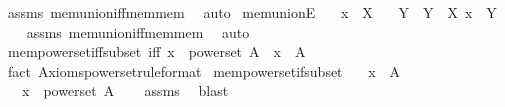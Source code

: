 \begin{isabellebody}
\isamarkupfalse%
\ assms\ mem{\isacharunderscore}{\kern0pt}union{\isacharunderscore}{\kern0pt}iff{\isacharunderscore}{\kern0pt}mem{\isacharunderscore}{\kern0pt}mem\ \isamarkupfalse%
\ auto%
\endisatagproof
{\isafoldproof}%
%
\isadelimproof
\isanewline
%
\endisadelimproof
\isanewline
{}\isamarkupfalse%
\ mem{\isacharunderscore}{\kern0pt}unionE{\isacharcolon}{\kern0pt}\isanewline
\ \ \ {\isachardoublequoteopen}x\ {\isasymin}\ {\isasymUnion}X{\isachardoublequoteclose}\isanewline
\ \ \ Y\ \ {\isachardoublequoteopen}Y\ {\isasymin}\ X{\isachardoublequoteclose}\ {\isachardoublequoteopen}x\ {\isasymin}\ Y{\isachardoublequoteclose}\isanewline
%
\isadelimproof
\ \ %
\endisadelimproof
%
\isatagproof
{}\isamarkupfalse%
\ assms\ mem{\isacharunderscore}{\kern0pt}union{\isacharunderscore}{\kern0pt}iff{\isacharunderscore}{\kern0pt}mem{\isacharunderscore}{\kern0pt}mem\ \isamarkupfalse%
\ auto%
\endisatagproof
{\isafoldproof}%
%
\isadelimproof
\isanewline
%
\endisadelimproof
\isanewline
{}\isamarkupfalse%
\ mem{\isacharunderscore}{\kern0pt}powerset{\isacharunderscore}{\kern0pt}iff{\isacharunderscore}{\kern0pt}subset\ {\isacharbrackleft}{\kern0pt}iff{\isacharbrackright}{\kern0pt}{\isacharcolon}{\kern0pt}\ {\isachardoublequoteopen}{\isacharparenleft}{\kern0pt}x\ {\isasymin}\ powerset\ A{\isacharparenright}{\kern0pt}\ {\isasymlongleftrightarrow}\ {\isacharparenleft}{\kern0pt}x\ {\isasymsubseteq}\ A{\isacharparenright}{\kern0pt}{\isachardoublequoteclose}\isanewline
%
\isadelimproof
\ \ %
\endisadelimproof
%
\isatagproof
{}\isamarkupfalse%
\ {\isacharparenleft}{\kern0pt}fact\ Axioms{\isachardot}{\kern0pt}powerset{\isacharbrackleft}{\kern0pt}rule{\isacharunderscore}{\kern0pt}format{\isacharbrackright}{\kern0pt}{\isacharparenright}{\kern0pt}%
\endisatagproof
{\isafoldproof}%
%
\isadelimproof
\isanewline
%
\endisadelimproof
\isanewline
{}\isamarkupfalse%
\ mem{\isacharunderscore}{\kern0pt}powerset{\isacharunderscore}{\kern0pt}if{\isacharunderscore}{\kern0pt}subset{\isacharcolon}{\kern0pt}\isanewline
\ \ \ {\isachardoublequoteopen}x\ {\isasymsubseteq}\ A{\isachardoublequoteclose}\isanewline
\ \ \ {\isachardoublequoteopen}x\ {\isasymin}\ powerset\ A{\isachardoublequoteclose}\isanewline
%
\isadelimproof
\ \ %
\endisadelimproof
%
\isatagproof
{}\isamarkupfalse%
\ assms\ \isamarkupfalse%
\ blast%
\endisatagproof
{\isafoldproof}%

\end{isabellebody}
